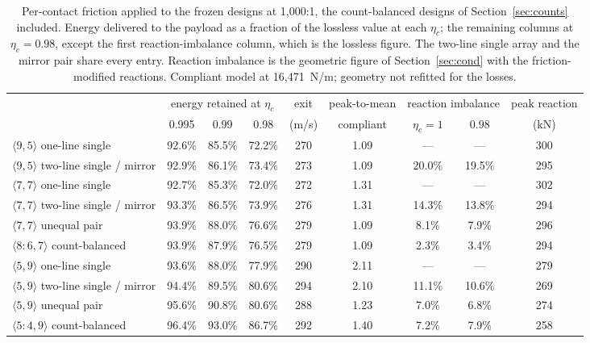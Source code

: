 \documentclass[preprint,12pt,number]{elsarticle}
\newcommand{\cfg}[2]{\langle #1,#2\rangle}
\newcommand{\ptm}{peak-to-mean}
\begin{document}
\begin{table}[H]
\centering
\caption{Per-contact friction applied to the frozen designs at 1,000:1, the count-balanced designs of Section~\ref{sec:counts} included. Energy delivered to the payload as a fraction of the lossless value at each $\eta_c$; the remaining columns at $\eta_c = 0.98$, except the first reaction-imbalance column, which is the lossless figure. The two-line single array and the mirror pair share every entry. Reaction imbalance is the geometric figure of Section~\ref{sec:cond} with the friction-modified reactions. Compliant model at 16,471~N/m; geometry not refitted for the losses.}
\label{tab:friction}
\footnotesize
\begin{adjustbox}{max width=\linewidth}
\begin{tabular}{@{}lccccccc c@{}}
\toprule
& \multicolumn{3}{c}{energy retained at $\eta_c$} & exit & \ptm{} & \multicolumn{2}{c}{reaction imbalance} & peak reaction \\
\cmidrule(lr){2-4}\cmidrule(lr){7-8}
& 0.995 & 0.99 & 0.98 & (m/s) & compliant & $\eta_c = 1$ & 0.98 & (kN) \\
\midrule
$\cfg{9}{5}$ one-line single & 92.6\% & 85.5\% & 72.2\% & 270 & 1.09 & --- & --- & 300 \\
$\cfg{9}{5}$ two-line single / mirror & 92.9\% & 86.1\% & 73.4\% & 273 & 1.09 & 20.0\% & 19.5\% & 295 \\
$\cfg{7}{7}$ one-line single & 92.7\% & 85.3\% & 72.0\% & 272 & 1.31 & --- & --- & 302 \\
$\cfg{7}{7}$ two-line single / mirror & 93.3\% & 86.5\% & 73.9\% & 276 & 1.31 & 14.3\% & 13.8\% & 294 \\
$\cfg{7}{7}$ unequal pair & 93.9\% & 88.0\% & 76.6\% & 279 & 1.09 & 8.1\% & 7.9\% & 296 \\
$\cfg{8{:}6}{7}$ count-balanced & 93.9\% & 87.9\% & 76.5\% & 279 & 1.09 & 2.3\% & 3.4\% & 294 \\
$\cfg{5}{9}$ one-line single & 93.6\% & 88.0\% & 77.9\% & 290 & 2.11 & --- & --- & 279 \\
$\cfg{5}{9}$ two-line single / mirror & 94.4\% & 89.5\% & 80.6\% & 294 & 2.10 & 11.1\% & 10.6\% & 269 \\
$\cfg{5}{9}$ unequal pair & 95.6\% & 90.8\% & 80.6\% & 288 & 1.23 & 7.0\% & 6.8\% & 274 \\
$\cfg{5{:}4}{9}$ count-balanced & 96.4\% & 93.0\% & 86.7\% & 292 & 1.40 & 7.2\% & 7.9\% & 258 \\
\bottomrule
\end{tabular}
\end{adjustbox}
\end{table}
\end{document}
